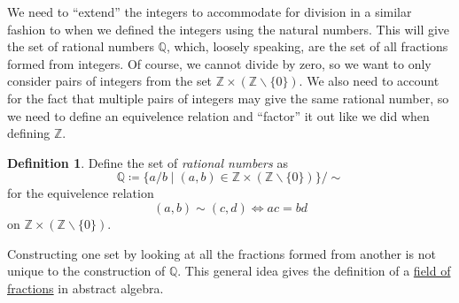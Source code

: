 \documentclass{article}
\newcommand{\Q}{\mathbb{Q}}
\newcommand{\Z}{\mathbb{Z}}
\theoremstyle{definition}
\newtheorem{definition}{Definition}[section]
\begin{document}
	We need to ``extend'' the integers to accommodate for division in a similar fashion to when we defined the integers using the natural numbers. This will give the set of rational numbers $\Q$, which, loosely speaking, are the set of all fractions formed from integers. Of course, we cannot divide by zero, so we want to only consider pairs of integers from the set $\Z\times(\Z\backslash\{0\})$. We also need to account for the fact that multiple pairs of integers may give the same rational number, so we need to define an equivelence relation and ``factor'' it out like we did when defining $\Z$. 
	
	
	\begin{definition}\label{def}
		Define the set of \textit{\color{red}rational numbers} as $$ \Q\coloneqq\{a/b\mid(a,b)\in\Z\times(\Z\backslash\{0\}) \}/\sim $$ for the equivelence relation 
		$$ (a,b) \sim (c,d) \iff ac = bd$$ on $\Z\times(\Z\backslash\{0\})$. 
	\end{definition}

	Constructing one set by looking at all the fractions formed from another is not unique to the construction of $\Q$. This general idea gives the definition of a  \href{https://mathweb.ucsd.edu/~jmckerna/Teaching/15-16/Spring/103B/l_14.pdf}{field of fractions} in abstract algebra.
\end{document}
